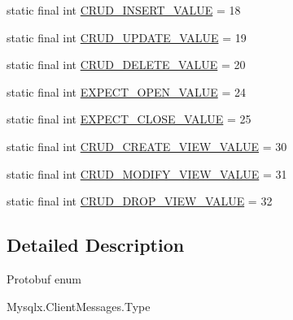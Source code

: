 \begin{DoxyCompactItemize}
\item 
static final int \mbox{\hyperlink{enumcom_1_1mysql_1_1cj_1_1x_1_1protobuf_1_1_mysqlx_1_1_client_messages_1_1_type_acfcebe7fb276af7578dbcdff5f21f98d}{C\+R\+U\+D\+\_\+\+I\+N\+S\+E\+R\+T\+\_\+\+V\+A\+L\+UE}} = 18
\item 
static final int \mbox{\hyperlink{enumcom_1_1mysql_1_1cj_1_1x_1_1protobuf_1_1_mysqlx_1_1_client_messages_1_1_type_aeab506babfa9b931fe20062364c55cee}{C\+R\+U\+D\+\_\+\+U\+P\+D\+A\+T\+E\+\_\+\+V\+A\+L\+UE}} = 19
\item 
static final int \mbox{\hyperlink{enumcom_1_1mysql_1_1cj_1_1x_1_1protobuf_1_1_mysqlx_1_1_client_messages_1_1_type_ad3d52d64b5a384a1c39559cb1679345b}{C\+R\+U\+D\+\_\+\+D\+E\+L\+E\+T\+E\+\_\+\+V\+A\+L\+UE}} = 20
\item 
static final int \mbox{\hyperlink{enumcom_1_1mysql_1_1cj_1_1x_1_1protobuf_1_1_mysqlx_1_1_client_messages_1_1_type_a5ac46467b6910d700a22750bdb775672}{E\+X\+P\+E\+C\+T\+\_\+\+O\+P\+E\+N\+\_\+\+V\+A\+L\+UE}} = 24
\item 
static final int \mbox{\hyperlink{enumcom_1_1mysql_1_1cj_1_1x_1_1protobuf_1_1_mysqlx_1_1_client_messages_1_1_type_ac4fac2cca52024d0e3bf7bfb7ca79778}{E\+X\+P\+E\+C\+T\+\_\+\+C\+L\+O\+S\+E\+\_\+\+V\+A\+L\+UE}} = 25
\item 
static final int \mbox{\hyperlink{enumcom_1_1mysql_1_1cj_1_1x_1_1protobuf_1_1_mysqlx_1_1_client_messages_1_1_type_a4c93e361c616b3208530fb44f46a8ad0}{C\+R\+U\+D\+\_\+\+C\+R\+E\+A\+T\+E\+\_\+\+V\+I\+E\+W\+\_\+\+V\+A\+L\+UE}} = 30
\item 
static final int \mbox{\hyperlink{enumcom_1_1mysql_1_1cj_1_1x_1_1protobuf_1_1_mysqlx_1_1_client_messages_1_1_type_a12484d803e6d7e638428f554fd08f359}{C\+R\+U\+D\+\_\+\+M\+O\+D\+I\+F\+Y\+\_\+\+V\+I\+E\+W\+\_\+\+V\+A\+L\+UE}} = 31
\item 
static final int \mbox{\hyperlink{enumcom_1_1mysql_1_1cj_1_1x_1_1protobuf_1_1_mysqlx_1_1_client_messages_1_1_type_abad1b92a8c928147a47364971a18c0b3}{C\+R\+U\+D\+\_\+\+D\+R\+O\+P\+\_\+\+V\+I\+E\+W\+\_\+\+V\+A\+L\+UE}} = 32
\end{DoxyCompactItemize}


\subsection{Detailed Description}
Protobuf enum
\begin{DoxyCode}
Mysqlx.ClientMessages.Type 
\end{DoxyCode}
 

